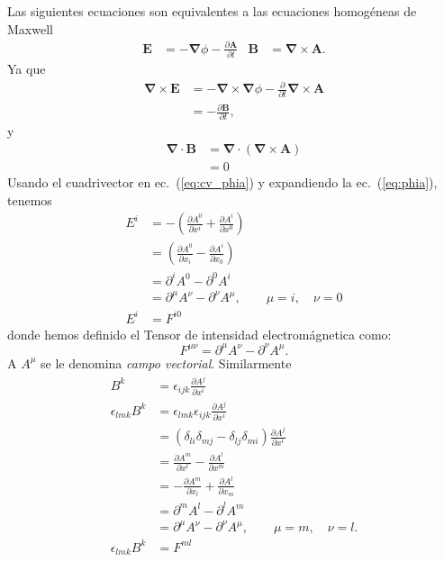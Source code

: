 Las siguientes ecuaciones son equivalentes a las ecuaciones homog\'eneas de Maxwell
\begin{align}
  \label{eq:phia}
  \mathbf{E}&=-\boldsymbol{\nabla}\phi-\frac{\partial\mathbf{A}}{\partial t}&
  \mathbf{B}&=\boldsymbol{\nabla}\times\mathbf{A}.
\end{align}
Ya que
\begin{align*}
  \boldsymbol{\nabla}\times\mathbf{E}&=-\boldsymbol{\nabla}\times\boldsymbol{\nabla}\phi-\frac{\partial}{\partial t}\boldsymbol{\nabla}\times\mathbf{A}\\
  &=-\frac{\partial\mathbf{B}}{\partial t},
\end{align*}
y
\begin{align*}
  \boldsymbol{\nabla}\cdot\mathbf{B}&=\boldsymbol{\nabla}\cdot(\boldsymbol{\nabla}\times\mathbf{A})\\
  &=0
\end{align*}
Usando el cuadrivector en ec.~(\ref{eq:cv_phia}) y
expandiendo la ec.~(\ref{eq:phia}), tenemos
\begin{align}
  E^i&=-(\frac{\partial A^0}{\partial x^{i}}+\frac{\partial A^{i}}{\partial x^0})\nonumber\\
  &=(\frac{\partial A^0}{\partial x_i}-\frac{\partial A^{i}}{\partial x_0})\nonumber\\
  &=\partial^{i}A^0-\partial^0 A^{i}\nonumber\\
  \label{eq:Efmunu}
  &=\partial^\mu A^\nu-\partial^\nu A^\mu,
  \qquad 
  \mu=i,\quad \nu=0\\
  \label{eq:E_Fi0} %
  E^{i}&=F^{i0}
\end{align}
donde hemos definido el Tensor de intensidad electrom\'agnetica como:
\begin{equation}
  \label{eq:fmunu}
    F^{\mu\nu}=\partial^\mu A^\nu-\partial^\nu A^\mu.
\end{equation}
A $A^\mu$ se le denomina \emph{campo vectorial}. Similarmente
\begin{align}
  B^k&=\epsilon_{ijk}\frac{\partial A^j}{\partial x^{i}}\nonumber\\
  \epsilon_{lmk}B^k&=\epsilon_{lmk}\epsilon_{ijk}\frac{\partial A^j}{\partial x^{i}}\nonumber\\
  &=(\delta_{li}\delta_{mj}-\delta_{lj}\delta_{mi})\frac{\partial A^j}{\partial x^{i}}\nonumber\\
  &=\frac{\partial A^m}{\partial x^l}-\frac{\partial A^l}{\partial x^m}\nonumber\\
  &=-\frac{\partial A^m}{\partial x_l}+\frac{\partial A^l}{\partial x_m}\nonumber\\
  &=\partial^m A^l-\partial^l A^m\nonumber\\
  \label{eq:Bfmunu}
  &=\partial^\mu A^\nu-\partial^\nu A^\mu,
  \qquad 
  \mu=m,\quad \nu=l.\\
  \label{eq:BFij}
\epsilon_{lmk}B^k&=F^{ml}
\end{align}
